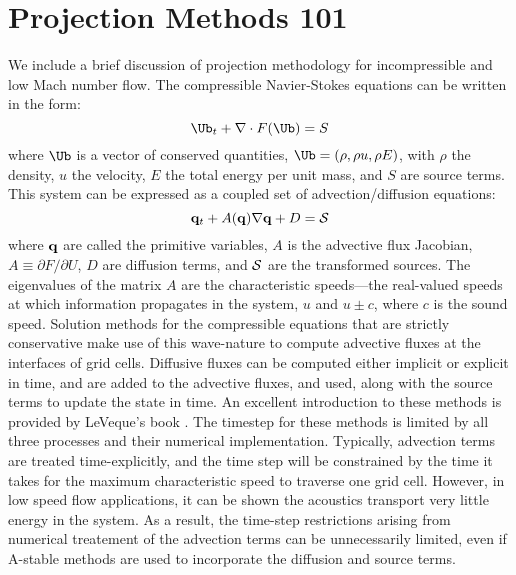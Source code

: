 \section{Projection Methods 101}

We include a brief discussion of projection methodology for
incompressible and low Mach number flow.
The compressible Navier-Stokes equations can be written in the form:
\begin{equation}
\Ub_t + \nabla \cdot F(\Ub) = S
\end{equation}
where $\Ub$ is a vector of conserved quantities, $\Ub = (\rho, \rho u,
\rho E)$, with $\rho$ the density, $u$ the velocity, $E$ the total
energy per unit mass, and $S$ are source terms.  This system
can be expressed as a coupled set of advection/diffusion equations:
\begin{equation}
{\bf q}_t + A({\bf q}) \nabla {\bf q} + D = {\cal S}
\end{equation}
where ${\bf q}$ are called the primitive variables, $A$ is the advective
flux Jacobian, $A \equiv \partial F / \partial U$, $D$ are diffusion terms, 
and ${\cal S}$ are the transformed sources.  The eigenvalues of the
matrix $A$ are the characteristic speeds---the real-valued speeds at which
information propagates in the system, $u$ and $u
\pm c$, where $c$ is the sound speed.  Solution methods for the
compressible equations that are strictly conservative make use of this wave-nature to compute advective fluxes
at the interfaces of grid cells.  Diffusive fluxes can be computed 
either implicit or explicit in time, and are added to the advective fluxes,
and used, along with the source terms to update the state in time.  An
excellent introduction to these methods is provided by LeVeque's book
\cite{leveque}.  The timestep for these methods is limited by all three processes
and their numerical implementation.  Typically, advection terms are treated
time-explicitly, and the time step will be constrained by the time
it takes for the maximum characteristic speed to traverse one grid cell.
However, in low speed flow applications, it can be shown the acoustics 
transport very little energy in the system.  As a result, the time-step 
restrictions arising from numerical treatement of the advection terms
can be unnecessarily limited, even if A-stable methods are used to incorporate
the diffusion and source terms.

